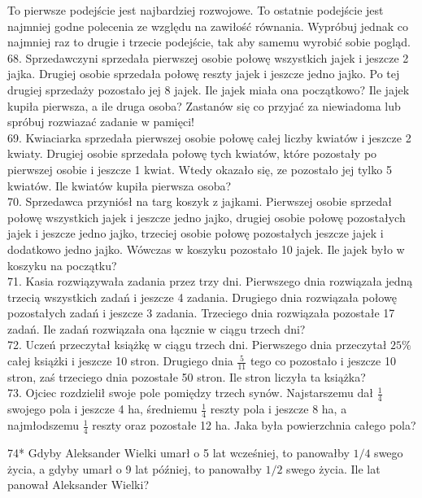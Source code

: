 \documentclass[10pt]{article}
\begin{document}
To pierwsze podejście jest najbardziej rozwojowe. To ostatnie podejście jest najmniej godne polecenia ze względu na zawiłość równania. Wypróbuj jednak co najmniej raz to drugie i trzecie podejście, tak aby samemu wyrobić sobie pogląd.\\
68. Sprzedawczyni sprzedała pierwszej osobie połowę wszystkich jajek i jeszcze 2 jajka. Drugiej osobie sprzedała połowę reszty jajek i jeszcze jedno jajko. Po tej drugiej sprzedaży pozostało jej 8 jajek. Ile jajek miała ona początkowo? Ile jajek kupiła pierwsza, a ile druga osoba? Zastanów się co przyjać za niewiadoma lub spróbuj rozwiazać zadanie w pamięci!\\
69. Kwiaciarka sprzedała pierwszej osobie połowę całej liczby kwiatów i jeszcze 2 kwiaty. Drugiej osobie sprzedała połowę tych kwiatów, które pozostały po pierwszej osobie i jeszcze 1 kwiat. Wtedy okazało się, ze pozostało jej tylko 5 kwiatów. Ile kwiatów kupiła pierwsza osoba?\\
70. Sprzedawca przyniósł na targ koszyk z jajkami. Pierwszej osobie sprzedał połowę wszystkich jajek i jeszcze jedno jajko, drugiej osobie połowę pozostałych jajek i jeszcze jedno jajko, trzeciej osobie połowę pozostałych jeszcze jajek i dodatkowo jedno jajko. Wówczas w koszyku pozostało 10 jajek. Ile jajek było w koszyku na początku?\\
71. Kasia rozwiązywała zadania przez trzy dni. Pierwszego dnia rozwiązała jedną trzecią wszystkich zadań i jeszcze 4 zadania. Drugiego dnia rozwiązała połowę pozostałych zadań i jeszcze 3 zadania. Trzeciego dnia rozwiązała pozostałe 17 zadań. Ile zadań rozwiązała ona łącznie w ciągu trzech dni?\\
72. Uczeń przeczytał książkę w ciągu trzech dni. Pierwszego dnia przeczytał \(25 \%\) całej książki i jeszcze 10 stron. Drugiego dnia \(\frac{5}{11}\) tego co pozostało i jeszcze 10 stron, zaś trzeciego dnia pozostałe 50 stron. Ile stron liczyła ta książka?\\
73. Ojciec rozdzielił swoje pole pomiędzy trzech synów. Najstarszemu dał \(\frac{1}{4}\) swojego pola i jeszcze 4 ha, średniemu \(\frac{1}{4}\) reszty pola i jeszcze 8 ha, a najmłodszemu \(\frac{1}{4}\) reszty oraz pozostałe 12 ha. Jaka była powierzchnia całego pola?

74* Gdyby Aleksander Wielki umarł o 5 lat wcześniej, to panowałby \(1 / 4\) swego życia, a gdyby umarł o 9 lat później, to panowałby \(1 / 2\) swego życia. Ile lat panował Aleksander Wielki?
\end{document}
